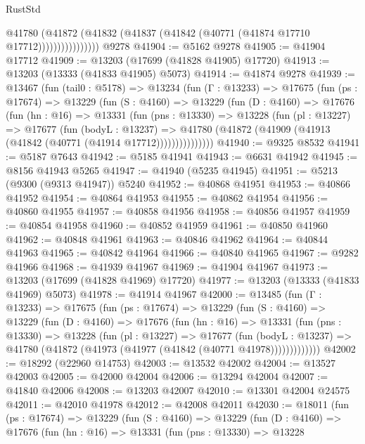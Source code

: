 \begin{lexlean}{RustStd}
\begin{coremodule}
                      @41780
                        (@41872
                          (@41832 (@41837 (@41842 (@40771 (@41874 @17710 @17712))))))))))))))))
    @9278
@41904 := @5162 @9278
@41905 := @41904 @17712
@41909 := @13203 (@17699 (@41828 @41905) @17720)
@41913 := @13203 (@13333 (@41833 @41905) @5073)
@41914 := @41874 @9278
@41939 := @13467
    (fun (tail0 : @5178) =>
    @13234
      (fun (Γ : @13233) =>
      @17675
        (fun (ps : @17674) =>
        @13229
          (fun (S : @4160) =>
          @13229
            (fun (D : @4160) =>
            @17676
              (fun (hn : @16) =>
              @13331
                (fun (pns : @13330) =>
                @13228
                  (fun (pl : @13227) =>
                  @17677
                    (fun (bodyL : @13237) =>
                    @41780 (@41872 (@41909 (@41913 (@41842 (@40771 (@41914 @17712)))))))))))))))
@41940 := @9325 @8532
@41941 := @5187 @7643
@41942 := @5185 @41941
@41943 := @6631 @41942
@41945 := @8156 @41943 @5265
@41947 := @41940 (@5235 @41945)
@41951 := @5213 (@9300 (@9313 @41947)) @5240
@41952 := @40868 @41951
@41953 := @40866 @41952
@41954 := @40864 @41953
@41955 := @40862 @41954
@41956 := @40860 @41955
@41957 := @40858 @41956
@41958 := @40856 @41957
@41959 := @40854 @41958
@41960 := @40852 @41959
@41961 := @40850 @41960
@41962 := @40848 @41961
@41963 := @40846 @41962
@41964 := @40844 @41963
@41965 := @40842 @41964
@41966 := @40840 @41965
@41967 := @9282 @41966
@41968 := @41939 @41967
@41969 := @41904 @41967
@41973 := @13203 (@17699 (@41828 @41969) @17720)
@41977 := @13203 (@13333 (@41833 @41969) @5073)
@41978 := @41914 @41967
@42000 := @13485
    (fun (Γ : @13233) =>
    @17675
      (fun (ps : @17674) =>
      @13229
        (fun (S : @4160) =>
        @13229
          (fun (D : @4160) =>
          @17676
            (fun (hn : @16) =>
            @13331
              (fun (pns : @13330) =>
              @13228
                (fun (pl : @13227) =>
                @17677
                  (fun (bodyL : @13237) =>
                  @41780 (@41872 (@41973 (@41977 (@41842 (@40771 @41978)))))))))))))
@42002 := @18292 (@22960 @14753)
@42003 := @13532 @42002
@42004 := @13527 @42003
@42005 := @42000 @42004
@42006 := @13294 @42004
@42007 := @41840 @42006
@42008 := @13203 @42007
@42010 := @13301 @42004 @24575
@42011 := @42010 @41978
@42012 := @42008 @42011
@42030 := @18011
    (fun (ps : @17674) =>
    @13229
      (fun (S : @4160) =>
      @13229
        (fun (D : @4160) =>
        @17676
          (fun (hn : @16) =>
          @13331
            (fun (pns : @13330) =>
            @13228

\end{coremodule}
\end{lexlean}
